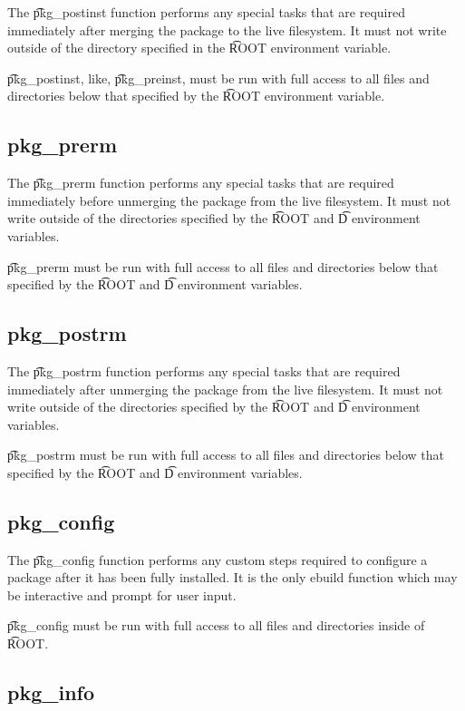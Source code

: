 The \t{pkg\_postinst} function performs any special tasks that are required immediately after
merging the package to the live filesystem. It must not write outside of the directory specified
in the \t{ROOT} environment variable.

\t{pkg\_postinst}, like, \t{pkg\_preinst}, must be run with full access to all files and directories
below that specified by the \t{ROOT} environment variable.

\subsection{pkg\_prerm}
\label{pkg-prerm-function}

The \t{pkg\_prerm} function performs any special tasks that are required immediately before
unmerging the package from the live filesystem. It must not write outside of the directories specified
by the \t{ROOT} and \t{D} environment variables.

\t{pkg\_prerm} must be run with full access to all files and directories below that specified by
the \t{ROOT} and \t{D} environment variables.

\subsection{pkg\_postrm}
\label{pkg-postrm-function}

The \t{pkg\_postrm} function performs any special tasks that are required immediately after
unmerging the package from the live filesystem. It must not write outside of the directories specified
by the \t{ROOT} and \t{D} environment variables.

\t{pkg\_postrm} must be run with full access to all files and directories below that specified by
the \t{ROOT} and \t{D} environment variables.

\subsection{pkg\_config}
\label{pkg-config-function}

The \t{pkg\_config} function performs any custom steps required to configure a package after it has been
fully installed. It is the only ebuild function which may be interactive and prompt for user input.

\t{pkg\_config} must be run with full access to all files and directories inside of \t{ROOT}.

\subsection{pkg\_info}
\label{pkg-info-function}

